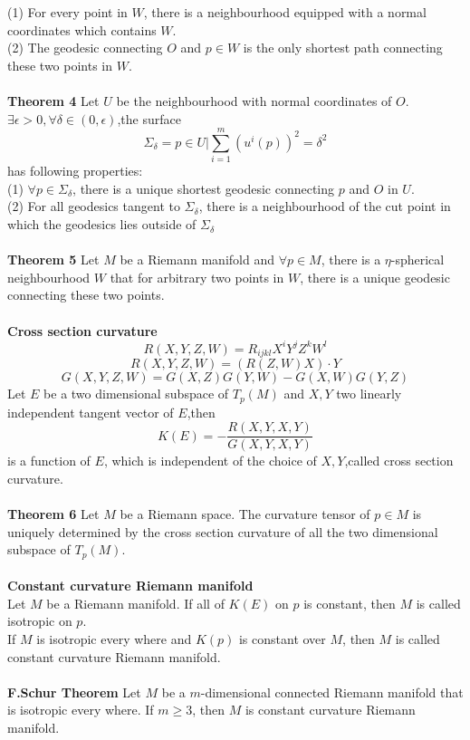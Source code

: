 \documentclass{article}
\begin{document}
(1) For every point in $W$, there is a neighbourhood equipped with a normal coordinates which contains $W$.\\
(2) The geodesic connecting $O$ and $p \in W$ is the only shortest path connecting these two points in $W$.\\ \\
\textbf{Theorem 4} Let $U$ be the neighbourhood with normal coordinates of $O$. $\exists \epsilon >0, \forall \delta \in (0,\epsilon)$,the surface
\[\Sigma_{\delta} = {p \in U | \sum_{i=1}^{m}} (u^i(p))^2 = \delta^2\]
has following properties:\\
(1) $\forall p \in \Sigma_{\delta}$, there is a unique shortest geodesic connecting $p$ and $O$ in $U$.\\
(2) For all geodesics tangent to $\Sigma_{\delta}$, there is a neighbourhood of the cut point in which the geodesics lies outside of $\Sigma_{\delta}$ \\ \\
\textbf{Theorem 5} Let $M$ be a Riemann manifold and $\forall p \in M$, there is a $\eta$-spherical neighbourhood $W$ that for arbitrary two points in $W$, there is a unique geodesic connecting these two points.\\ \\
\textbf{Cross section curvature} \\
\[R(X,Y,Z,W) = R_{ijkl}X^iY^jZ^kW^l\]
\[R(X,Y,Z,W) = (R(Z,W)X) \cdot Y\]
\[G(X,Y,Z,W) = G(X,Z)G(Y,W) - G(X,W)G(Y,Z)\]
Let $E$ be a two dimensional subspace of $T_p(M)$ and $X,Y$ two linearly independent tangent vector of $E$,then
\[K(E) = -\frac{R(X,Y,X,Y)}{G(X,Y,X,Y)}\]
is a function of $E$, which is independent of the choice of $X,Y$,called cross section curvature.\\ \\
\textbf{Theorem 6} Let $M$ be a Riemann space. The curvature tensor of $p \in M$ is uniquely determined by the cross section curvature of all the two dimensional subspace of $T_p(M)$.\\ \\ 
\textbf{Constant curvature Riemann manifold} \\
Let $M$ be a Riemann manifold. If all of $K(E)$ on $p$ is constant, then $M$ is called isotropic on $p$. \\
If $M$ is isotropic every where and $K(p)$ is constant over $M$, then $M$ is called constant curvature Riemann manifold.\\ \\
\textbf{F.Schur Theorem} Let $M$ be a $m$-dimensional connected Riemann manifold that is isotropic every where. If $m \geq 3$, then $M$ is constant curvature Riemann manifold.
\end{document}
